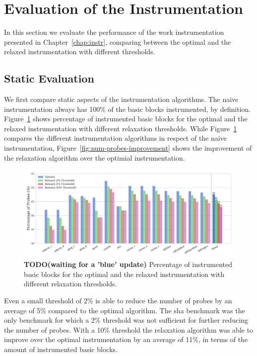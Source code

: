 \section{Evaluation of the Instrumentation}

In this section we evaluate the performance of the work instrumentation presented in Chapter~\ref{chap:instr}, comparing between the optimal and the relaxed instrumentation with different thresholds.

\subsection{Static Evaluation}

We first compare static aspects of the instrumentation algorithms.
The naive instrumentation always has 100\% of the basic blocks instrumented, by definition.
Figure~\ref{fig:num-probes} shows percentage of instrumented basic blocks for the optimal and the relaxed instrumentation with different relaxation thresholds.
While Figure~\ref{fig:num-probes} compares the different instrumentation algorithms in respect of the naive instrumentation, Figure~\ref{fig:num-probes-improvement} shows the improvement of the relaxation algorithm over the optimial instrumentation.

\begin{figure}[ht]
    \centering
    \includegraphics[width=\textwidth]{figs/num-probes.pdf}
    \caption{\textbf{TODO(waiting for a 'blue' update)} Percentage of instrumented basic blocks for the optimal and the relaxed instrumentation with different relaxation thresholds.}
    \label{fig:num-probes}
\end{figure}

Even a small threshold of 2\% is able to reduce the number of probes by an average of 5\% compared to the optimal algorithm. 
The {\flagstype sha} benchmark was the only benchmark for which a 2\% threshold was not sufficient for further reducing the number of probes.
With a 10\% threshold the relaxation algorithm was able to improve over the optimal instrumentation by an average of 11\%, in terms of the amount of instrumented basic blocks.

